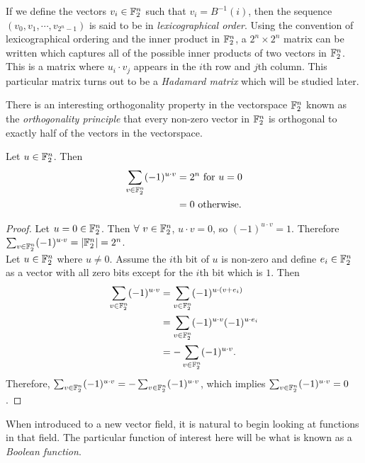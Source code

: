 \par If we define the vectors $v_i\in\mathbb{F}_2^n$ such that $v_i=B^{-1}(i)$, then the sequence
$(v_0,v_1,\cdots,v_{2^n-1})$ is said to be in {\em lexicographical order}. Using the convention
of lexicographical ordering and the inner product in $\mathbb{F}_2^n$, a $2^n\times 2^n$
matrix can be written which captures all of the possible inner products of two vectors in
$\mathbb{F}_2^n$. This is a matrix where $u_i\cdot v_j$ appears in the $i$th row and $j$th column.
This particular matrix turns out to be a {\em Hadamard matrix} which will be studied later.

\par There is an interesting orthogonality property in the vectorspace $\mathbb{F}_2^n$ known as the
{\em orthogonality principle} that every non-zero vector in $\mathbb{F}_2^n$ is orthogonal to
exactly half of the vectors in the vectorspace.

\begin{theorem}
	\label{thm:orthogonality-principle}
	Let $u\in\mathbb{F}_2^n$. Then
	\begin{align*}
		\sum_{v\in\mathbb{F}_2^n}(-1)^{u\cdot v} &= 2^n {\rm \ for\ } u=0 \\
		                                   &= 0 {\rm \ otherwise.}
  \end{align*}
\end{theorem}

\begin{proof}
	Let $u=0\in\mathbb{F}_2^n$. Then $\forall\ v\in\mathbb{F}_2^n$, $u\cdot v=0$, so
	$(-1)^{u\cdot v}=1$. Therefore $\sum_{v\in\mathbb{F}_2^n}(-1)^{u\cdot v}=\lvert\mathbb{F}_2^n\rvert=2^n$. \\

	Let $u\in\mathbb{F}_2^n$ where $u\not=0$. Assume the $i$th bit of $u$ is non-zero and
	define $e_i\in\mathbb{F}_2^n$ as a vector with all zero bits except for the $i$th bit which is $1$. Then
	\begin{align*}
		\sum_{v\in\mathbb{F}_2^n}(-1)^{u\cdot v} &= \sum_{v\in\mathbb{F}_2^n}(-1)^{u\cdot (v+e_i)} \\
		                                   &= \sum_{v\in\mathbb{F}_2^n}(-1)^{u\cdot v}(-1)^{u\cdot e_i} \\
																			 &= -\sum_{v\in\mathbb{F}_2^n}(-1)^{u\cdot v}.
  \end{align*}
	Therefore, $\sum_{v\in\mathbb{F}_2^n}(-1)^{u\cdot v}=-\sum_{v\in\mathbb{F}_2^n}(-1)^{u\cdot v}$, which implies
	$\sum_{v\in\mathbb{F}_2^n}(-1)^{u\cdot v}=0$.
\end{proof}

\par When introduced to a new vector field, it is natural to begin looking at functions in
that field. The particular function of interest here will be what is known as a {\em Boolean function}.

